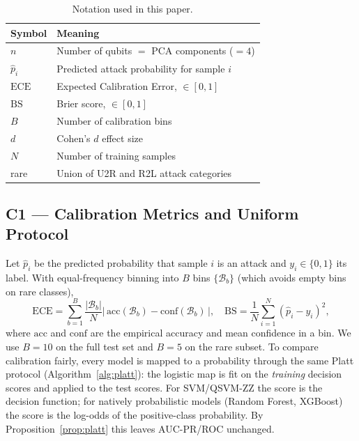\documentclass[journal]{IEEEtran}
\newcommand{\ZZ}{\textsc{ZZ}}
\newcommand{\QSVM}{QSVM-\ZZ}
\newcommand{\ECE}{\mathrm{ECE}}
\newcommand{\Brier}{\mathrm{BS}}
\begin{document}
\begin{table}[t]
\centering
\caption{Notation used in this paper.}
\label{tab:notation}
\small
\begin{tabular}{ll}
\toprule
Symbol & Meaning\\\midrule
$n$ & Number of qubits $=$ PCA components ($=4$)\\
$\hat{p}_i$ & Predicted attack probability for sample $i$\\
$\ECE$ & Expected Calibration Error, $\in[0,1]$\\
$\Brier$ & Brier score, $\in[0,1]$\\
$B$ & Number of calibration bins\\
$d$ & Cohen's $d$ effect size\\
$N$ & Number of training samples\\
rare & Union of U2R and R2L attack categories\\
\bottomrule
\end{tabular}
\end{table}

\subsection{C1 --- Calibration Metrics and Uniform Protocol}
Let $\hat{p}_i$ be the predicted probability that sample $i$ is an attack
and $y_i\in\{0,1\}$ its label. With equal-frequency binning into $B$ bins
$\{\mathcal{B}_b\}$ (which avoids empty bins on rare classes),
\begin{equation}
\ECE=\sum_{b=1}^{B}\frac{|\mathcal{B}_b|}{N}
     \big|\,\mathrm{acc}(\mathcal{B}_b)-\mathrm{conf}(\mathcal{B}_b)\,\big|,
\quad
\Brier=\frac{1}{N}\sum_{i=1}^{N}(\hat{p}_i-y_i)^2,
\end{equation}
where $\mathrm{acc}$ and $\mathrm{conf}$ are the empirical accuracy and
mean confidence in a bin. We use $B{=}10$ on the full test set and
$B{=}5$ on the rare subset. To compare calibration fairly, every model is
mapped to a probability through the same Platt protocol
(Algorithm~\ref{alg:platt}): the logistic map is fit on the
\emph{training} decision scores and applied to the test scores. For
SVM/\QSVM{} the score is the decision function; for natively
probabilistic models (Random Forest, XGBoost) the score is the log-odds
of the positive-class probability. By Proposition~\ref{prop:platt} this
leaves AUC-PR/ROC unchanged.
\end{document}
